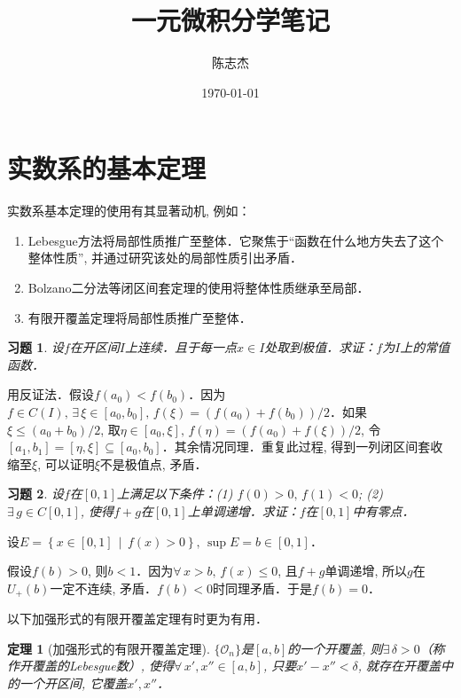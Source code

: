 \documentclass[11pt,a4paper]{ctexart}
\title{一元微积分学笔记}
\author{陈志杰}
\date{\today}
\makeatletter
\theoremstyle{thmseries} %
\newtheorem{thm}{定理}[section]
\theoremstyle{exerseries}
\newtheorem{exer}{习题}[section]
\renewenvironment{proof}[1][\proofname]{\par
  \pushQED{\qed}%
  \normalfont \topsep6\p@\@plus6\p@\relax
  \trivlist
  \item[\hskip\labelsep
        \itshape
    #1\@addpunct{}]\ignorespaces
}{%
  \popQED\endtrivlist\@endpefalse
}
\newenvironment{pf}{\begin{proof}[\bfseries\upshape 证\quad]}{\end{proof}}
\newcommand{\cbra}[1]{\mathopen{}\left\{#1\right\}}
\makeatother
\begin{document}
\maketitle
\thispagestyle{empty}
\tableofcontents
\justifying
\newpage


\section{实数系的基本定理}
实数系基本定理的使用有其显著动机, 例如：
\begin{enumerate}
	\item Lebesgue方法将局部性质推广至整体．它聚焦于``函数在什么地方失去了这个整体性质'', 并通过研究该处的局部性质引出矛盾．
	\item Bolzano二分法等闭区间套定理的使用将整体性质继承至局部．
	\item 有限开覆盖定理将局部性质推广至整体．
\end{enumerate}

\begin{exer}
	设$f$在开区间$I$上连续．且于每一点$x\in I$处取到极值．求证：$f$为$I$上的常值函数．
\end{exer}
\begin{pf}
	用反证法．假设$f(a_0)<f(b_0)$．因为$f\in C(I),\,\exists\,\xi\in[a_0,b_0],\,f(\xi)=(f(a_0)+f(b_0))/2$．如果$\xi\leq(a_0+b_0)/2$, 取$\eta\in[a_0,\xi],\,f(\eta)=(f(a_0)+f(\xi))/2$, 令$[a_1,b_1]=[\eta,\xi]\subseteq[a_0,b_0]$．其余情况同理．重复此过程, 得到一列闭区间套收缩至$\xi$, 可以证明$\xi$不是极值点, 矛盾．
\end{pf}

\begin{exer}
	设$f$在$[0,1]$上满足以下条件：(1) $f(0)>0,\,f(1)<0$; (2) $\exists\,g\in C[0,1]$, 使得$f+g$在$[0,1]$上单调递增．求证：$f$在$[0,1]$中有零点．
\end{exer}
\begin{pf}
	设$E=\cbra{x\in[0,1]\,\middle\vert\,f(x)>0},\,\sup E=b\in[0,1]$．
	
	假设$f(b)>0$, 则$b<1$．因为$\forall\,x>b,\,f(x)\leq0$, 且$f+g$单调递增, 所以$g$在$U_+(b)$一定不连续, 矛盾．$f(b)<0$时同理矛盾．于是$f(b)=0$．
\end{pf}

以下加强形式的有限开覆盖定理有时更为有用．
\begin{thm}[加强形式的有限开覆盖定理]
	$\{\mathcal{O}_n\}$是$[a,b]$的一个开覆盖, 则$\exists\,\delta>0$（称作开覆盖的Lebesgue数）, 使得$\forall\,x',x''\in[a,b]$, 只要$x'-x''<\delta$, 就存在开覆盖中的一个开区间, 它覆盖$x',x''$．
\end{thm}
\end{document}
